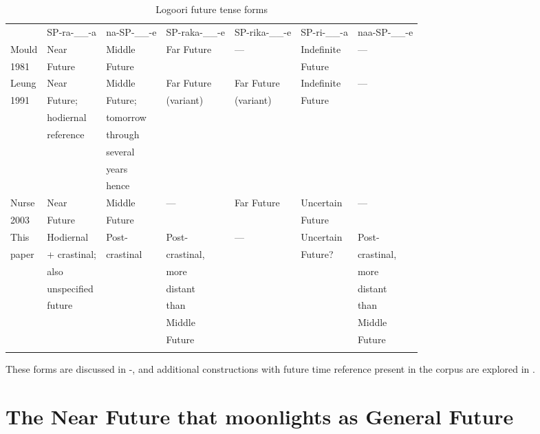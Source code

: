 \documentclass[output=paper]{langsci/langscibook}
\begin{document}
\begin{table}
\begin{tabular}{lllllll} &  SP-{ra-}\_\_{-a} &  {na-}SP-\_\_{-e} &  SP-{raka-}\_\_-{e} &  SP-{rika}-\_\_-{e} &  SP-{ri}-\_\_{-a} &  {naa-}SP-\_\_{-e} \\
\lsptoprule
 Mould &  Near &  Middle &  Far Future &  — &  Indefinite &  — \\ 
 1981 &  Future &  Future & & &  Future & \\ \midrule
 Leung &  Near &  Middle &  Far Future &  Far Future &  Indefinite & \mdseries  — \\ 
 1991 &  Future; &  Future; &  (variant) &  (variant) &  Future & \\
&  hodiernal &  tomorrow & & & &  \\
&  reference &  through & & & & \\
& &  several & & & & \\
& &  years & & & & \\
& &  hence & & & & \\
\midrule 
 Nurse &  Near &  Middle &  — &  Far Future &  Uncertain & \mdseries  — \\ 
 2003 &  Future &  Future & & &  Future & \\ \midrule
 This &  Hodiernal &  Post- &  Post- &  — &  Uncertain &  Post- \\
 paper &  + crastinal; &  crastinal &  crastinal, & &  Future? &  crastinal, \\
&  also & &  more & & &  more \\
&  unspecified & &  distant & & &  distant \\
&  future & &  than & & &  than \\
& & &  Middle & & &  Middle \\
& & &  Future & & &  Future \\
\lspbottomrule
\end{tabular}
\caption{Logoori future tense forms}
\label{tab:sarvasy:1}
\end{table}

These forms are discussed in -, and additional constructions with future time reference present in the corpus are explored in .

\section{The Near Future that moonlights as General Future} \label{sec:sarvasy:3}
\end{document}
